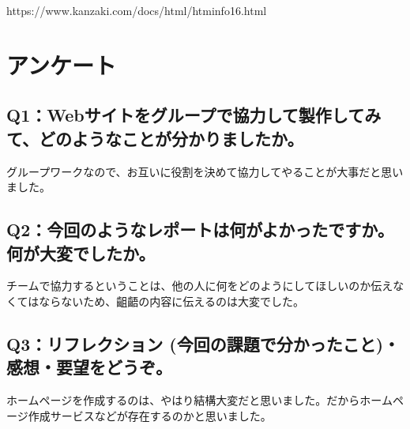\documentclass[12pt,a4j]{jarticle}
\begin{document}
https://www.kanzaki.com/docs/html/htminfo16.html

\section{アンケート}

\subsection{Q1：Webサイトをグループで協力して製作してみて、どのようなことが分かりましたか。}
グループワークなので、お互いに役割を決めて協力してやることが大事だと思いました。

\subsection{Q2：今回のようなレポートは何がよかったですか。何が大変でしたか。}
チームで協力するということは、他の人に何をどのようにしてほしいのか伝えなくてはならないため、齟齬の内容に伝えるのは大変でした。

\subsection{Q3：リフレクション (今回の課題で分かったこと)・感想・要望をどうぞ。}
ホームページを作成するのは、やはり結構大変だと思いました。だからホームページ作成サービスなどが存在するのかと思いました。
\end{document}
